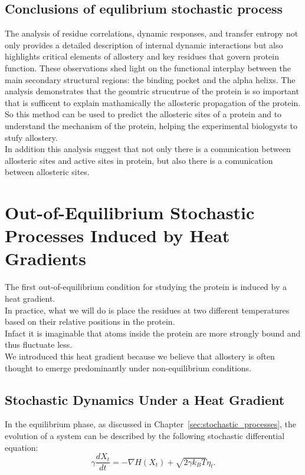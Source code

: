 \documentclass[English, Lau, oneside]{sapthesis}
\begin{document}
\section{Conclusions of equlibrium stochastic process}
\noindent The analysis of residue correlations, dynamic responses, and transfer entropy not only provides a detailed description of internal dynamic interactions but also highlights critical elements of allostery and key residues that govern protein function.
These observations shed light on the functional interplay between the main secondary structural regions:  the binding pocket and the alpha helixs.
The analysis demonstrates that the geomtric strucutrue of the protein is so important that is sufficent to explain mathamically the allosteric propagation of the protein.\\
So this method can be used to predict the allosteric sites of a protein and to understand the mechanism of the protein, helping the experimental biologysts to stufy allostery.\\
In addition this analysis suggest that not only there is a comunication between allosteric sites and active sites in protein, but also there is a comunication between allosteric sites.\\


\newpage
\chapter{Out-of-Equilibrium Stochastic Processes Induced by Heat Gradients}
\noindent The first out-of-equilibrium condition for studying the protein is induced by a heat gradient.\\
In practice, what we will do is place the residues at two different temperatures based on their relative positions in the protein.\\
Infact it is imaginable that atoms inside the protein are more strongly bound and thus fluctuate less.\\
We introduced this heat gradient because we believe that allostery is often thought to emerge predominantly under non-equilibrium conditions.\\


\newpage
\section{Stochastic Dynamics Under a Heat Gradient}
\noindent In the equilibrium phase, as discussed in Chapter~\ref{sec:stochastic_processes}, the evolution of a system can be described by the following stochastic differential equation:
\begin{equation}
    \gamma \frac{dX_t}{dt} = -\nabla H(X_t) + \sqrt{2 \gamma k_B T} \eta_t.
\end{equation}
\end{document}
